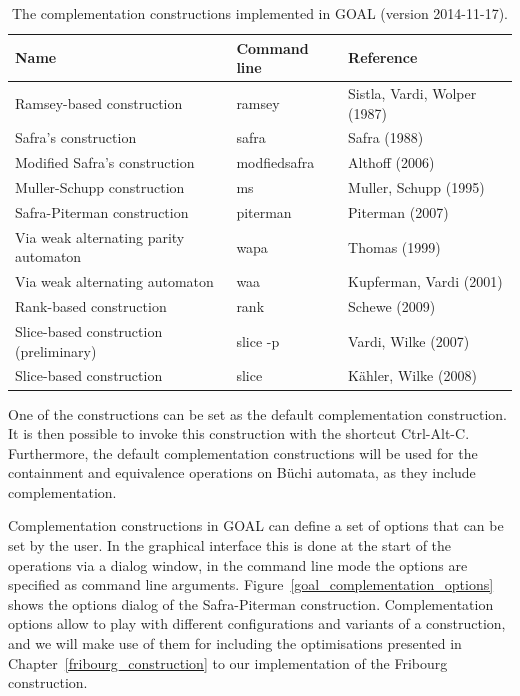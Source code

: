 \begin{table}
\caption{The complementation constructions implemented in GOAL (version 2014-11-17).}
\begin{center}
\begin{tabular}{|l|l|l|}
\hline
Name & Command line & Reference \\
\hline
Ramsey-based construction & ramsey & Sistla, Vardi, Wolper (1987)~\cite{PrasadSistla1987217} \\
\hline
Safra's construction & safra & Safra (1988)~\cite{1988_safra_1} \\
\hline
Modified Safra's construction & modfiedsafra & Althoff (2006)~\cite{2006_althoff} \\
\hline
Muller-Schupp construction & ms & Muller, Schupp (1995)~\cite{Muller199569} \\
\hline
Safra-Piterman construction & piterman & Piterman (2007)~\cite{2007_piterman} \\
\hline
Via weak alternating parity automaton & wapa & Thomas (1999)~\cite{1999_thomas} \\
\hline
Via weak alternating automaton & waa & Kupferman, Vardi (2001) \cite{Kupferman:2001} \\
\hline
Rank-based construction & rank & Schewe (2009) \cite{schewe2009buchi} \\
\hline
Slice-based construction (preliminary) & slice -p & Vardi, Wilke (2007) \cite{vardi2007automata} \\
\hline
Slice-based construction & slice & Kähler, Wilke (2008) \cite{2008_kaehler} \\
\hline
\end{tabular}
\end{center}
\label{goal_constructions}
\end{table}

One of the constructions can be set as the default complementation construction. It is then possible to invoke this construction with the shortcut Ctrl-Alt-C. Furthermore, the default complementation constructions will be used for the containment and equivalence operations on Büchi automata, as they include complementation.

Complementation constructions in GOAL can define a set of options that can be set by the user. In the graphical interface this is done at the start of the operations via a dialog window, in the command line mode the options are specified as command line arguments. Figure~\ref{goal_complementation_options} shows the options dialog of the Safra-Piterman construction. Complementation options allow to play with different configurations and variants of a construction, and we will make use of them for including the optimisations presented in Chapter~\ref{fribourg_construction} to our implementation of the Fribourg construction.


